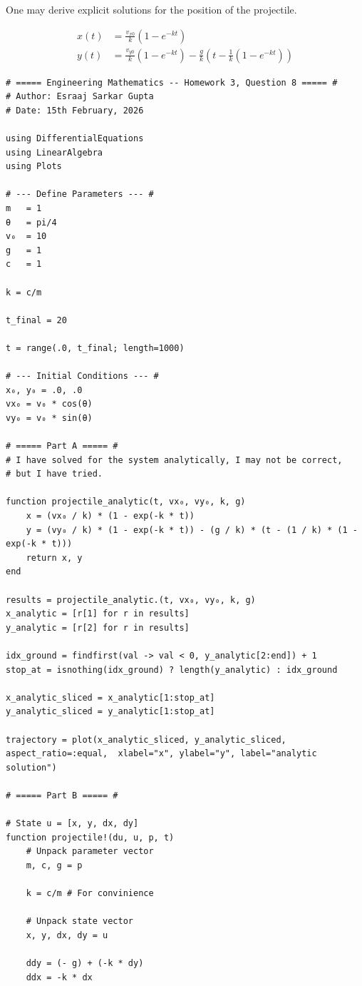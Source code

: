 \documentclass{article}
\begin{document}
One may derive explicit solutions for the position of the projectile.

\begin{align}
x(t) &= \frac{v_{x0}}{k} \left( 1 - e^{-kt} \right) \\
y(t) &= \frac{v_{y0}}{k} \left( 1 - e^{-kt} \right) - \frac{g}{k} \left( t - \frac{1}{k}(1 - e^{-kt}) \right)
\end{align}

\begin{verbatim}
# ===== Engineering Mathematics -- Homework 3, Question 8 ===== #
# Author: Esraaj Sarkar Gupta
# Date: 15th February, 2026

using DifferentialEquations
using LinearAlgebra
using Plots

# --- Define Parameters --- #
m   = 1
θ   = pi/4
v₀  = 10
g   = 1
c   = 1

k = c/m

t_final = 20

t = range(.0, t_final; length=1000)

# --- Initial Conditions --- #
x₀, y₀ = .0, .0
vx₀ = v₀ * cos(θ)
vy₀ = v₀ * sin(θ)

# ===== Part A ===== #
# I have solved for the system analytically, I may not be correct,
# but I have tried.

function projectile_analytic(t, vx₀, vy₀, k, g)
    x = (vx₀ / k) * (1 - exp(-k * t))
    y = (vy₀ / k) * (1 - exp(-k * t)) - (g / k) * (t - (1 / k) * (1 - exp(-k * t)))
    return x, y
end

results = projectile_analytic.(t, vx₀, vy₀, k, g)
x_analytic = [r[1] for r in results]
y_analytic = [r[2] for r in results]

idx_ground = findfirst(val -> val < 0, y_analytic[2:end]) + 1
stop_at = isnothing(idx_ground) ? length(y_analytic) : idx_ground

x_analytic_sliced = x_analytic[1:stop_at]
y_analytic_sliced = y_analytic[1:stop_at]

trajectory = plot(x_analytic_sliced, y_analytic_sliced, aspect_ratio=:equal,  xlabel="x", ylabel="y", label="analytic solution")

# ===== Part B ===== #

# State u = [x, y, dx, dy]
function projectile!(du, u, p, t)
    # Unpack parameter vector
    m, c, g = p

    k = c/m # For convinience

    # Unpack state vector
    x, y, dx, dy = u

    ddy = (- g) + (-k * dy)
    ddx = -k * dx


\end{verbatim}
\end{document}
